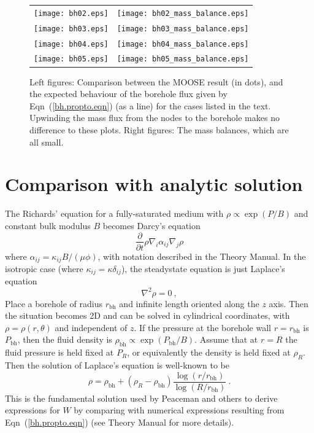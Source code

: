 \documentclass[]{scrreprt}
\begin{document}
\begin{figure}[htb]
\centering
\begin{tabular}{cc}
\texttt{[image: bh02.eps]} &
\texttt{[image: bh02\_mass\_balance.eps]} \\
\texttt{[image: bh03.eps]} &
\texttt{[image: bh03\_mass\_balance.eps]} \\
\texttt{[image: bh04.eps]} &
\texttt{[image: bh04\_mass\_balance.eps]} \\
\texttt{[image: bh05.eps]} &
\texttt{[image: bh05\_mass\_balance.eps]}
\end{tabular}
\caption{Left figures: Comparison between the MOOSE result (in dots), and the
  expected behaviour of the borehole flux given by
  Eqn~(\ref{bh.propto.eqn}) (as a line) for the cases listed in the
  text.  Upwinding the mass flux from the nodes to the borehole makes
  no difference to these plots.  Right
  figures: The mass balances, which are all small.}
\label{bh02_05.fig}
\end{figure}

\section{Comparison with analytic solution}
The Richards' equation for a fully-saturated medium with $\rho \propto
\exp(P/B)$ and constant bulk modulus $B$ becomes Darcy's equation
\begin{equation}
\frac{\partial}{\partial t}\rho \nabla_{i}\alpha_{ij}\nabla_{j}\rho
\end{equation}
where $\alpha_{ij} = \kappa_{ij}B/(\mu\phi)$, with notation described
in the Theory Manual.   In the isotropic case (where $\kappa_{ij} =
\kappa \delta_{ij}$), the steadystate equation is just Laplace's
equation
\begin{equation}
\nabla^{2}\rho = 0 \ ,
\end{equation}
Place a borehole of radius $r_{\mathrm{bh}}$ and infinite length
oriented along the $z$ axis.  Then the situation becomes 2D and can be
solved in cylindrical coordinates, with $\rho=\rho(r,\theta)$ and
independent of $z$.  If the pressure at the borehole wall
$r=r_{\mathrm{bh}}$ is $P_{\mathrm{bh}}$, then the fluid density is
$\rho_{\mathrm{bh}} \propto \exp(P_{\mathrm{bh}}/B)$.  Assume that at
$r=R$ the fluid pressure is held fixed at $P_{R}$, or equivalently the
density is held fixed at $\rho_{R}$.  Then the solution of Laplace's
equation is well-known to be
\begin{equation}
\rho = \rho_{\mathrm{bh}} + (\rho_{R} - \rho_{\mathrm{bh}})
\frac{\log(r/r_{\mathrm{bh}})}{\log(R/r_{\mathrm{bh}})} \ .
\label{eqn.log.bh}
\end{equation}
This is the fundamental solution used by Peaceman and others to derive
expressions for $W$ by comparing with numerical expressions resulting
from Eqn~(\ref{bh.propto.eqn}) (see Theory Manual for more details).
\end{document}
